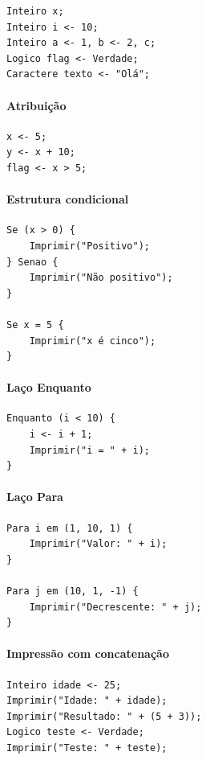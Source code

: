 \documentclass[12pt,a4paper]{article}
\begin{document}
\begin{lstlisting}[language=CF]
Inteiro x;
Inteiro i <- 10;
Inteiro a <- 1, b <- 2, c;
Logico flag <- Verdade;
Caractere texto <- "Olá";
\end{lstlisting}

\paragraph{Atribuição}

\begin{lstlisting}[language=CF]
x <- 5;
y <- x + 10;
flag <- x > 5;
\end{lstlisting}

\paragraph{Estrutura condicional}

\begin{lstlisting}[language=CF]
Se (x > 0) {
    Imprimir("Positivo");
} Senao {
    Imprimir("Não positivo");
}

Se x = 5 {
    Imprimir("x é cinco");
}
\end{lstlisting}

\paragraph{Laço Enquanto}

\begin{lstlisting}[language=CF]
Enquanto (i < 10) {
    i <- i + 1;
    Imprimir("i = " + i);
}
\end{lstlisting}

\paragraph{Laço Para}

\begin{lstlisting}[language=CF]
Para i em (1, 10, 1) {
    Imprimir("Valor: " + i);
}

Para j em (10, 1, -1) {
    Imprimir("Decrescente: " + j);
}
\end{lstlisting}

\paragraph{Impressão com concatenação}

\begin{lstlisting}[language=CF]
Inteiro idade <- 25;
Imprimir("Idade: " + idade);
Imprimir("Resultado: " + (5 + 3));
Logico teste <- Verdade;
Imprimir("Teste: " + teste);
\end{lstlisting}
\end{document}
